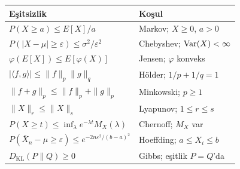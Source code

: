 \begin{center}
\renewcommand{\arraystretch}{1.5}
\small
\begin{tabular}{p{5.5cm}p{6.5cm}}
\hline
\textbf{Eşitsizlik} & \textbf{Koşul} \\
\hline
$P(X\geq a)\leq E[X]/a$ & Markov; $X\geq0$, $a>0$ \\
$P(|X-\mu|\geq\varepsilon)\leq\sigma^2/\varepsilon^2$ & Chebyshev; $\operatorname{Var}(X)<\infty$ \\
$\varphi(E[X])\leq E[\varphi(X)]$ & Jensen; $\varphi$ konveks \\
$|\langle f,g\rangle|\leq\|f\|_p\|g\|_q$ & Hölder; $1/p+1/q=1$ \\
$\|f+g\|_p\leq\|f\|_p+\|g\|_p$ & Minkowski; $p\geq1$ \\
$\|X\|_r\leq\|X\|_s$ & Lyapunov; $1\leq r\leq s$ \\
$P(X\geq t)\leq\inf_\lambda e^{-\lambda t}M_X(\lambda)$ & Chernoff; $M_X$ var \\
$P(\bar X_n-\mu\geq\varepsilon)\leq e^{-2n\varepsilon^2/(b-a)^2}$ & Hoeffding; $a\leq X_i\leq b$ \\
$D_{\mathrm{KL}}(P\|Q)\geq 0$ & Gibbs; eşitlik $P=Q$'da \\
\hline
\end{tabular}
\end{center}

